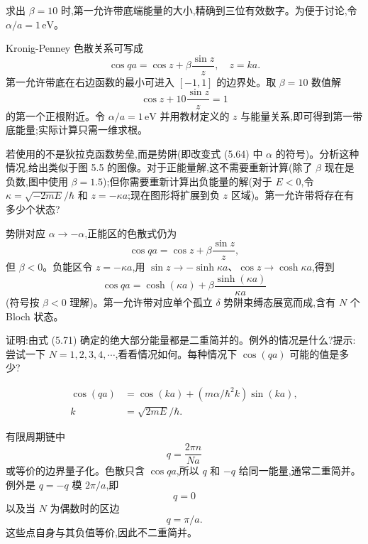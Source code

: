 \begin{question}
求出 $\beta=10$ 时,第一允许带底端能量的大小,精确到三位有效数字。为便于讨论,令 $\alpha/a=1\,\mathrm{eV}$。
\begin{solution}

Kronig-Penney 色散关系可写成
\[
\cos qa=\cos z+\beta\frac{\sin z}{z},
\quad z=ka.
\]
第一允许带底在右边函数的最小可进入 $[-1,1]$ 的边界处。取 $\beta=10$ 数值解
\[
\cos z+10\frac{\sin z}{z}=1
\]
的第一个正根附近。令 $\alpha/a=1\,\mathrm{eV}$ 并用教材定义的 $z$ 与能量关系,即可得到第一带底能量;实际计算只需一维求根。

\end{solution}
\end{question}

\begin{question}
若使用的不是狄拉克函数势垒,而是势阱(即改变式 (5.64) 中 $\alpha$ 的符号)。分析这种情况,给出类似于图 5.5 的图像。对于正能量解,这不需要重新计算(除了 $\beta$ 现在是负数,图中使用 $\beta=1.5$);但你需要重新计算出负能量的解(对于 $E<0$,令 $\kappa=\sqrt{-2mE}/\hbar$ 和 $z=-\kappa a$;现在图形将扩展到负 $z$ 区域)。第一允许带将存在有多少个状态?

\par\smallskip
{}

\begin{solution}

势阱对应 $\alpha\to-\alpha$,正能区的色散式仍为
\[
\cos qa=\cos z+\beta\frac{\sin z}{z},
\]
但 $\beta<0$。负能区令 $z=-\kappa a$,用 $\sin z\to-\sinh\kappa a$、$\cos z\to\cosh\kappa a$,得到
\[
\cos qa=\cosh(\kappa a)+\beta\frac{\sinh(\kappa a)}{\kappa a}
\]
(符号按 $\beta<0$ 理解)。第一允许带对应单个孤立 $\delta$ 势阱束缚态展宽而成,含有 $N$ 个 Bloch 状态。

\end{solution}
\end{question}

\begin{question}
证明:由式 (5.71) 确定的绝大部分能量都是二重简并的。例外的情况是什么?提示:尝试一下 $N=1,2,3,4,\cdots$,看看情况如何。每种情况下 $\cos(qa)$ 可能的值是多少?

\par\smallskip
{}\[\begin{aligned}\cos(qa)&=\cos(ka)+(m\alpha/\hbar^2k)\sin(ka),\\k&=\sqrt{2mE}/\hbar.\end{aligned}\]

\begin{solution}

有限周期链中
\[
q=\frac{2\pi n}{Na}
\]
或等价的边界量子化。色散只含 $\cos qa$,所以 $q$ 和 $-q$ 给同一能量,通常二重简并。例外是 $q=-q$ 模 $2\pi/a$,即
\[
q=0
\]
以及当 $N$ 为偶数时的区边
\[
q=\pi/a.
\]
这些点自身与其负值等价,因此不二重简并。

\end{solution}
\end{question}

